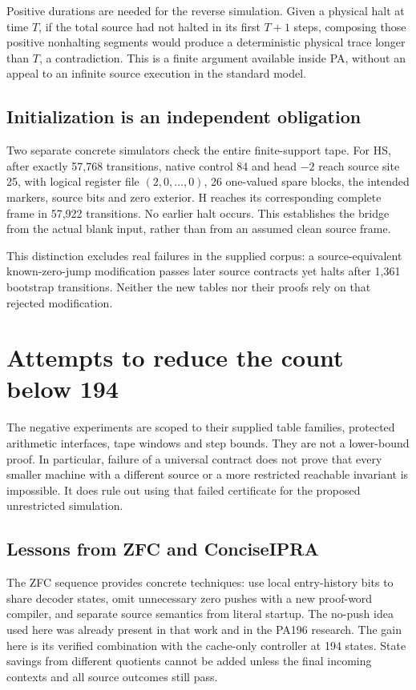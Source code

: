 \documentclass[11pt,letterpaper]{article}
\begin{document}
Positive durations are needed for the reverse simulation. Given a
physical halt at time $T$, if the total source had not halted in its
first $T+1$ steps, composing those positive nonhalting segments would
produce a deterministic physical trace longer than $T$, a contradiction.
This is a finite argument available inside PA, without an appeal to an
infinite source execution in the standard model.

\subsection{Initialization is an independent obligation}

Two separate concrete simulators check the entire finite-support tape.
For HS, after exactly 57,768 transitions, native control 84 and head
$-2$ reach source site 25, with logical register file $(2,0,\ldots,0)$,
26 one-valued spare blocks, the intended markers, source bits and zero
exterior. H reaches its corresponding complete frame in 57,922 transitions.
No earlier halt occurs. This establishes the bridge from the actual
blank input, rather than from an assumed clean source frame.

This distinction excludes real failures in the supplied corpus: a
source-equivalent known-zero-jump modification passes later source
contracts yet halts after 1,361 bootstrap transitions. Neither the new
tables nor their proofs rely on that rejected modification.

\section{Attempts to reduce the count below 194}
\label{sec:search}



The negative experiments are scoped to their supplied table families,
protected arithmetic interfaces, tape windows and step bounds. They are
not a lower-bound proof. In particular, failure of a universal contract
does not prove that every smaller machine with a different source or a
more restricted reachable invariant is impossible. It does rule out
using that failed certificate for the proposed unrestricted simulation.

\subsection{Lessons from ZFC and ConciseIPRA}

The ZFC sequence provides concrete techniques: use local entry-history
bits to share decoder states, omit unnecessary zero pushes with a new
proof-word compiler, and separate source semantics from literal startup.
The no-push idea used here was already present in that work and in the
PA196 research. The gain here is its verified combination with the
cache-only controller at 194 states. State savings from different
quotients cannot be added unless the final incoming contexts and all
source outcomes still pass.
\end{document}

